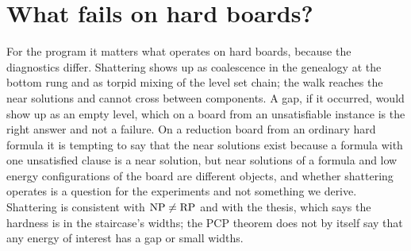 \section{What fails on hard boards?}

For the program it matters what operates on hard boards, because the diagnostics differ. Shattering shows up as coalescence in the genealogy at the bottom rung and as torpid mixing of the level set chain; the walk reaches the near solutions and cannot cross between components. A gap, if it occurred, would show up as an empty level, which on a board from an unsatisfiable instance is the right answer and not a failure. On a reduction board from an ordinary hard formula it is tempting to say that the near solutions exist because a formula with one unsatisfied clause is a near solution, but near solutions of a formula and low energy configurations of the board are different objects, and whether shattering operates is a question for the experiments and not something we derive. Shattering is consistent with $\mathrm{NP} \neq \mathrm{RP}$ and with the thesis, which says the hardness is in the staircase's widths; the PCP theorem does not by itself say that any energy of interest has a gap or small widths.
